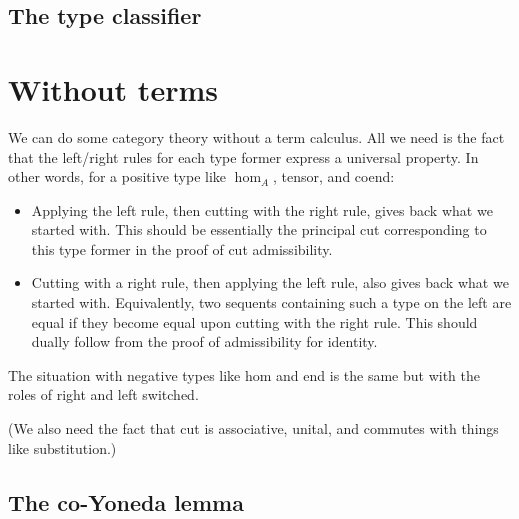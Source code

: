 \documentclass{amsart}
\def\mor#1{\hom_{#1}}
\begin{document}
\subsection{The type classifier}
\label{sec:type-classifier}


\section{Without terms}
\label{sec:without-terms}

We can do some category theory without a term calculus.
All we need is the fact that the left/right rules for each type former express a universal property.
In other words, for a positive type like $\mor A$, tensor, and coend:
\begin{itemize}
\item Applying the left rule, then cutting with the right rule, gives back what we started with.
  This should be essentially the principal cut corresponding to this type former in the proof of cut admissibility.
\item Cutting with a right rule, then applying the left rule, also gives back what we started with.
  Equivalently, two sequents containing such a type on the left are equal if they become equal upon cutting with the right rule.
  This should dually follow from the proof of admissibility for identity.
\end{itemize}
The situation with negative types like hom and end is the same but with the roles of right and left switched.

(We also need the fact that cut is associative, unital, and commutes with things like substitution.)


\subsection{The co-Yoneda lemma}
\label{sec:co-yoneda-noterms}
\end{document}
